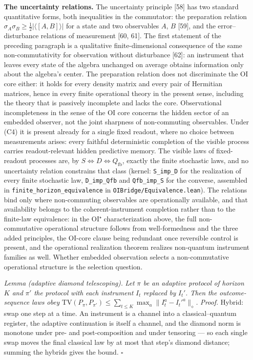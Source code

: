\documentclass[
]{article}
\begin{document}
\textbf{The uncertainty relations.} The uncertainty principle {[}58{]}
has two standard quantitative forms, both inequalities in the
commutator: the preparation relation
\(\sigma_A\sigma_B \geq \tfrac{1}{2}|\langle[A,B]\rangle|\) for a state
and two observables \(A\), \(B\) {[}59{]}, and the error--disturbance
relations of measurement {[}60, 61{]}. The first statement of the
preceding paragraph is a qualitative finite-dimensional consequence of
the same non-commutativity for observation without disturbance {[}62{]}:
an instrument that leaves every state of the algebra unchanged on
average obtains information only about the algebra's center. The
preparation relation does not discriminate the OI core either: it holds
for every density matrix and every pair of Hermitian matrices, hence in
every finite operational theory in the present sense, including the
theory that is passively incomplete and lacks the core. Observational
incompleteness in the sense of the OI core concerns the hidden sector of
an embedded observer, not the joint sharpness of non-commuting
observables. Under (C4) it is present already for a single fixed
readout, where no choice between measurements arises: every faithful
deterministic completion of the visible process carries readout-relevant
hidden predictive memory. The visible laws of fixed-readout processes
are, by \(S \iff D \iff Q_{\mathrm{fb}}\), exactly the finite stochastic
laws, and no uncertainty relation constrains that class (kernel:
\texttt{S\_imp\_D} for the realization of every finite stochastic law,
\texttt{D\_imp\_Qfb} and \texttt{Qfb\_imp\_S} for the converse,
assembled in \texttt{finite\_horizon\_equivalence} in
\texttt{OIBridge/Equivalence.lean}). The relations bind only where
non-commuting observables are operationally available, and that
availability belongs to the coherent-instrument completion rather than
to the finite-law equivalence: in the OI⁺ characterization above, the
full non-commutative operational structure follows from well-formedness
and the three added principles, the OI-core clause being redundant once
reversible control is present, and the operational realization theorem
realizes non-quantum instrument families as well. Whether embedded
observation selects a non-commutative operational structure is the
selection question.

\emph{Lemma (adaptive diamond telescoping).} \emph{Let \(\pi\) be an
adaptive protocol of horizon \(K\) and \(\pi'\) the protocol with each
instrument \(I_t\) replaced by \(I_t'\). Then the outcome-sequence laws
obey
\(\mathrm{TV}(P_\pi, P_{\pi'}) \leq \sum_{t \leq K} \max_a \|I_t^a - I_t'^a\|_\diamond\).}
\emph{Proof.} Hybrid: swap one step at a time. An instrument is a
channel into a classical--quantum register, the adaptive continuation is
itself a channel, and the diamond norm is monotone under pre- and
post-composition and under tensoring --- so each single swap moves the
final classical law by at most that step's diamond distance; summing the
hybrids gives the bound. \(\square\)
\end{document}
